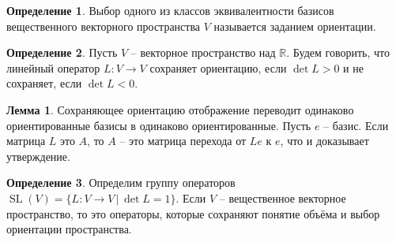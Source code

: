 \documentclass[10pt,a4paper,oneside]{book} %
\theoremstyle{definition}
\newtheorem*{defn}{Определение}
\newtheorem{lem}{Лемма}
\newcommand{\mb}[1]{\mathbb{#1}}
\newcommand{\SL}{\operatorname{SL}}
\def\dfn{\begin{defn}}
\def\edfn{\end{defn}}
\def\lm{\begin{lem}}
\def\elm{\end{lem}}
\begin{document}
\dfn Выбор одного из классов эквивалентности базисов вещественного векторного пространства $V$ называется заданием ориентации.
\edfn

\dfn Пусть $V$ -- векторное пространство над $\mb R$. Будем говорить, что линейный оператор $L\colon V \to V$ сохраняет ориентацию, если $\det L>0$ и не сохраняет, если $\det L<0$.
\edfn

\lm Сохраняющее ориентацию отображение переводит одинаково ориентированные базисы в одинаково ориентированные.
\proof Пусть $e$ -- базис. Если матрица $L$ это $A$, то $A$ -- это матрица перехода от $Le$ к $e$, что и доказывает утверждение. 
\endproof
\elm

\dfn Определим группу операторов $\SL(V)=\{ L\colon V \to V \,|\, \det L=1\}$. Если $V$ -- вещественное векторное пространство, то это операторы, которые сохраняют понятие объёма и  выбор ориентации пространства.
\edfn
\end{document}
